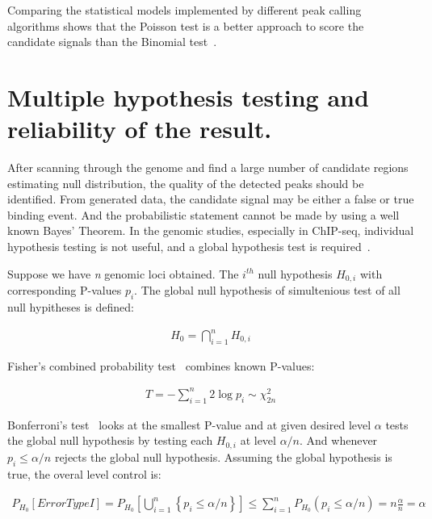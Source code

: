 Comparing the statistical models implemented by different peak calling algorithms shows that the Poisson test is a better approach to score the candidate signals than the Binomial test~\cite{thomas2017features}.

\section{Multiple hypothesis testing and reliability of the result.}

After scanning through the genome and find a large number of candidate regions estimating null distribution, the quality of the detected peaks should be identified. 
From generated data, the candidate signal may be either a false or true binding event. 
And the probabilistic statement cannot be made by using a well known Bayes' Theorem. 
In the genomic studies, especially in ChIP-seq, individual hypothesis testing is not useful, and a global hypothesis test is required~\cite{futschik2019omnibus}. 

Suppose we have \textit{n} genomic loci obtained.
The $i^{th}$ null hypothesis $H_{0,i}$ with corresponding P-values $p_i$.
The global null hypothesis of simultenious test of all null hypitheses  is defined:

\begin{align*}
    H_0 = \displaystyle\bigcap_{i=1}^{n} H_{0, i}
\end{align*}

Fisher's combined probability test~\cite{fisher1992statistical} combines known P-values:

\begin{align*}
    T = - \displaystyle \sum_{i=1}^{n} 2 \log p_i \sim  \chi_{2n}^{2}
\end{align*}

Bonferroni's test~\cite{hommel1988stagewise} looks at the smallest P-value and at given desired level $\alpha$ tests the global null hypothesis by testing each $H_{0,i}$ at level $\alpha /n$. 
And whenever $p_i \leq \alpha / n$ rejects the global null hypothesis.
Assuming the global hypothesis is true, the overal level control is: 

\begin{align*}
    P_{H_0}[Error Type I] = P_{H_0} \left[\bigcup_{i=1}^{n} \left\{ p_i \leq \alpha / n\right\}\right] \leq \sum_{i=1}^{n} P_{H_0}(p_i \le \alpha / n)  = n \frac{\alpha}{n} = \alpha
\end{align*}


